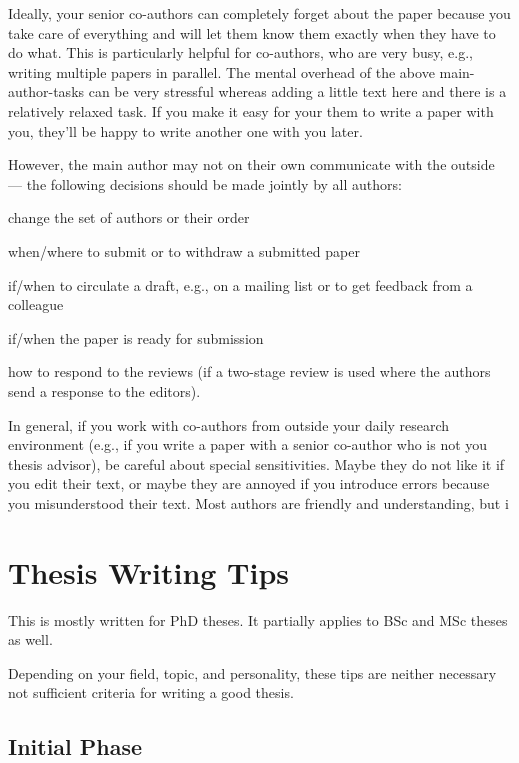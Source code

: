 \documentclass[12pt]{article}
\begin{document}
Ideally, your senior co-authors can completely forget about the paper because you take care of everything and will let them know them exactly when they have to do what.
This is particularly helpful for co-authors, who are very busy, e.g., writing multiple papers in parallel.
The mental overhead of the above main-author-tasks can be very stressful whereas adding a little text here and there is a relatively relaxed task.
If you make it easy for your them to write a paper with you, they'll be happy to write another one with you later.

However, the main author may not on their own communicate with the outside --- the following decisions should be made jointly by all authors:
\begin{compactitem}
 \item change the set of authors or their order
 \item when/where to submit or to withdraw a submitted paper
 \item if/when to circulate a draft, e.g., on a mailing list or to get feedback from a colleague
 \item if/when the paper is ready for submission
 \item how to respond to the reviews (if a two-stage review is used where the authors send a response to the editors).
\end{compactitem}

In general, if you work with co-authors from outside your daily research environment (e.g., if you write a paper with a senior co-author who is not you thesis advisor), be careful about special sensitivities.
Maybe they do not like it if you edit their text, or maybe they are annoyed if you introduce errors because you misunderstood their text.
Most authors are friendly and understanding, but i

\section{Thesis Writing Tips}

This is mostly written for PhD theses.
It partially applies to BSc and MSc theses as well.

Depending on your field, topic, and personality, these tips are neither necessary not sufficient criteria for writing a good thesis.

\subsection{Initial Phase}
\end{document}
